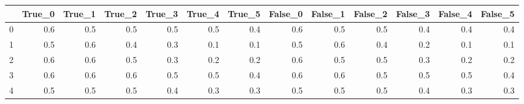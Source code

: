 \begin{tabular}{lrrrrrrrrrrrr}
\toprule
{} &  True\_0 &  True\_1 &  True\_2 &  True\_3 &  True\_4 &  True\_5 &  False\_0 &  False\_1 &  False\_2 &  False\_3 &  False\_4 &  False\_5 \\ \hline
\midrule
0 &     0.6 &     0.5 &     0.5 &     0.5 &     0.5 &     0.4 &      0.6 &      0.5 &      0.5 &      0.4 &      0.4 &      0.4 \\ \hline
1 &     0.5 &     0.6 &     0.4 &     0.3 &     0.1 &     0.1 &      0.5 &      0.6 &      0.4 &      0.2 &      0.1 &      0.1 \\ \hline
2 &     0.6 &     0.6 &     0.5 &     0.3 &     0.2 &     0.2 &      0.6 &      0.5 &      0.5 &      0.3 &      0.2 &      0.2 \\ \hline
3 &     0.6 &     0.6 &     0.6 &     0.5 &     0.5 &     0.4 &      0.6 &      0.6 &      0.5 &      0.5 &      0.5 &      0.4 \\ \hline
4 &     0.5 &     0.5 &     0.5 &     0.4 &     0.3 &     0.3 &      0.5 &      0.5 &      0.5 &      0.4 &      0.3 &      0.3 \\ \hline
\bottomrule
\end{tabular}
